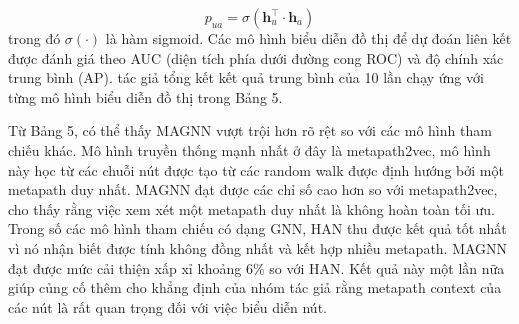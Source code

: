 \begin{equation}
  p_{u a}=\sigma\left(\mathbf{h}_{u}^{\top} \cdot \mathbf{h}_{a}\right)
\end{equation}
trong đó $\sigma(\cdot)$ là hàm sigmoid. Các mô hình biểu diễn đồ thị để dự đoán liên kết được đánh giá theo AUC (diện tích phía dưới đường cong ROC) và độ chính xác trung bình (AP). tác giả tổng kết kết quả trung bình của 10 lần chạy ứng với từng mô hình biểu diễn đồ thị trong Bảng 5. 

Từ Bảng 5, có thể thấy MAGNN vượt trội hơn rõ rệt so với các mô hình tham chiếu khác. Mô hình truyền thống mạnh nhất ở đây là metapath2vec, mô hình này học từ các chuỗi nút được tạo từ các random walk được định hướng bởi một metapath duy nhất. MAGNN đạt được các chỉ số cao hơn so với metapath2vec, cho thấy rằng việc xem xét một metapath duy nhất là không hoàn toàn tối ưu. Trong số các mô hình tham chiếu có dạng GNN, HAN thu được kết quả tốt nhất vì nó nhận biết được tính không đồng nhất và kết hợp nhiều metapath. MAGNN đạt được mức cải thiện xấp xỉ khoảng $6 \%$ so với HAN. Kết quả này một lần nữa giúp củng cố thêm cho khẳng định của nhóm tác giả rằng  metapath context của các nút là rất quan trọng đối với việc biểu diễn nút.

